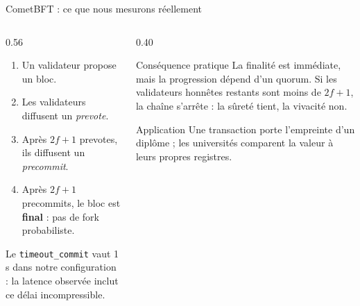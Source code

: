 \documentclass[10pt,aspectratio=169]{beamer}
\begin{document}
\begin{frame}{CometBFT : ce que nous mesurons réellement}
  \begin{columns}[T,onlytextwidth]
    \begin{column}{0.56\textwidth}
      \begin{enumerate}
        \item Un validateur propose un bloc.
        \item Les validateurs diffusent un \emph{prevote}.
        \item Après $2f+1$ prevotes, ils diffusent un \emph{precommit}.
        \item Après $2f+1$ precommits, le bloc est \textbf{final} : pas de fork probabiliste.
      \end{enumerate}
      \vspace{0.2cm}
      \small
      Le \texttt{timeout\_commit} vaut 1 s dans notre configuration : la latence
      observée inclut ce délai incompressible.
    \end{column}
    \begin{column}{0.40\textwidth}
      \begin{block}{Conséquence pratique}
        \small
        La finalité est immédiate, mais la progression dépend d'un quorum.
        Si les validateurs honnêtes restants sont moins de $2f+1$, la chaîne
        s'arrête : la sûreté tient, la vivacité non.
      \end{block}
      \begin{block}{Application}
        \small
        Une transaction porte l'empreinte d'un diplôme ; les universités
        comparent la valeur à leurs propres registres.
      \end{block}
    \end{column}
  \end{columns}
\end{frame}
\end{document}
